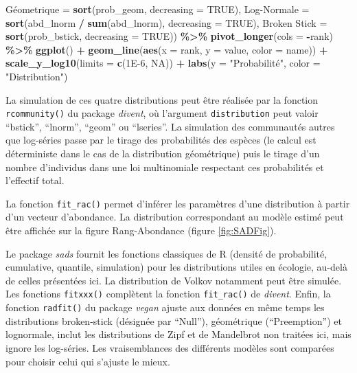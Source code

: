 \documentclass[
  11pt,
  american,
  a4paper,
  extrafontsizes,onecolumn,openright
  ]{memoir}
\newenvironment{Shaded}{\begin{snugshade}}{\end{snugshade}}
\newcommand{\AttributeTok}[1]{\textcolor[rgb]{0.13,0.29,0.53}{#1}}
\newcommand{\ConstantTok}[1]{\textcolor[rgb]{0.56,0.35,0.01}{#1}}
\newcommand{\FloatTok}[1]{\textcolor[rgb]{0.00,0.00,0.81}{#1}}
\newcommand{\FunctionTok}[1]{\textcolor[rgb]{0.13,0.29,0.53}{\textbf{#1}}}
\newcommand{\NormalTok}[1]{#1}
\newcommand{\OtherTok}[1]{\textcolor[rgb]{0.56,0.35,0.01}{#1}}
\newcommand{\SpecialCharTok}[1]{\textcolor[rgb]{0.81,0.36,0.00}{\textbf{#1}}}
\newcommand{\StringTok}[1]{\textcolor[rgb]{0.31,0.60,0.02}{#1}}
\begin{document}
\begin{Shaded}
\begin{Highlighting}[]
  \StringTok{\textasciigrave{}}\AttributeTok{Géometrique}\StringTok{\textasciigrave{}} \OtherTok{=} \FunctionTok{sort}\NormalTok{(prob\_geom, }\AttributeTok{decreasing =} \ConstantTok{TRUE}\NormalTok{),}
  \StringTok{\textasciigrave{}}\AttributeTok{Log{-}Normale}\StringTok{\textasciigrave{}} \OtherTok{=} \FunctionTok{sort}\NormalTok{(abd\_lnorm }\SpecialCharTok{/} \FunctionTok{sum}\NormalTok{(abd\_lnorm), }\AttributeTok{decreasing =} \ConstantTok{TRUE}\NormalTok{),}
  \StringTok{\textasciigrave{}}\AttributeTok{Broken Stick}\StringTok{\textasciigrave{}} \OtherTok{=} \FunctionTok{sort}\NormalTok{(prob\_bstick, }\AttributeTok{decreasing =} \ConstantTok{TRUE}\NormalTok{)) }\SpecialCharTok{\%\textgreater{}\%} 
  \FunctionTok{pivot\_longer}\NormalTok{(}\AttributeTok{cols =} \SpecialCharTok{{-}}\NormalTok{rank) }\SpecialCharTok{\%\textgreater{}\%} 
  \FunctionTok{ggplot}\NormalTok{() }\SpecialCharTok{+}
    \FunctionTok{geom\_line}\NormalTok{(}\FunctionTok{aes}\NormalTok{(}\AttributeTok{x =}\NormalTok{ rank, }\AttributeTok{y =}\NormalTok{ value, }\AttributeTok{color =}\NormalTok{ name)) }\SpecialCharTok{+}
    \FunctionTok{scale\_y\_log10}\NormalTok{(}\AttributeTok{limits =} \FunctionTok{c}\NormalTok{(}\FloatTok{1E{-}6}\NormalTok{, }\ConstantTok{NA}\NormalTok{)) }\SpecialCharTok{+}
    \FunctionTok{labs}\NormalTok{(}\AttributeTok{y =} \StringTok{"Probabilité"}\NormalTok{, }\AttributeTok{color =} \StringTok{"Distribution"}\NormalTok{)}
\end{Highlighting}
\end{Shaded}

\normalsize

La simulation de ces quatre distributions peut être réalisée par la fonction \texttt{rcommunity()} du package \emph{divent}, où l'argument \texttt{distribution} peut valoir \enquote{bstick}, \enquote{lnorm}, \enquote{geom} ou \enquote{lseries}.
La simulation des communautés autres que log-séries passe par le tirage des probabilités des espèces (le calcul est déterministe dans le cas de la distribution géométrique) puis le tirage d'un nombre d'individus dans une loi multinomiale respectant ces probabilités et l'effectif total.

La fonction \texttt{fit\_rac()} permet d'inférer les paramètres d'une distribution à partir d'un vecteur d'abondance.
La distribution correspondant au modèle estimé peut être affichée sur la figure Rang-Abondance (figure \ref{fig:SADFig}).

Le package \emph{sads} fournit les fonctions classiques de R (densité de probabilité, cumulative, quantile, simulation) pour les distributions utiles en écologie, au-delà de celles présentées ici.
La distribution de Volkov notamment peut être simulée.
Les fonctions \texttt{fitxxx()} complètent la fonction \texttt{fit\_rac()} de \emph{divent}.
Enfin, la fonction \texttt{radfit()} du package \emph{vegan} ajuste aux données en même temps les distributions broken-stick (désignée par \enquote{Null}), géométrique (\enquote{Preemption}) et lognormale, inclut les distributions de Zipf et de Mandelbrot non traitées ici, mais ignore les log-séries.
Les vraisemblances des différents modèles sont comparées pour choisir celui qui s'ajuste le mieux.
\end{document}
